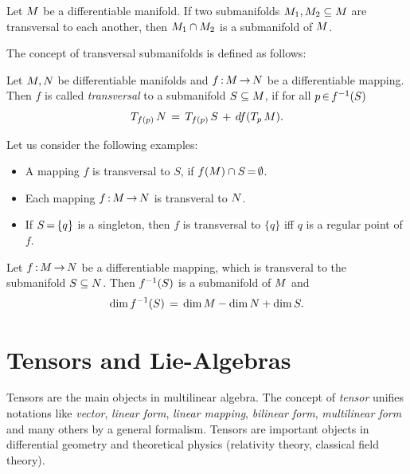 \documentclass[11pt,twoside]{article}
\begin{document}
\begin{theorem}
Let ${M}$ be a differentiable manifold.
If two submanifolds ${M}_1, {M}_2 \subseteq {M}$ are transversal
to each another,
then ${M}_1 \cap {M}_2$ is a submanifold of ${M}$.
\end{theorem}

\subparagraph{}
The concept of transversal submanifolds is defined as follows:

\begin{definition}
Let ${M},{N}$ be differentiable manifolds
and $f {\,:\,} {M} {\,\to\,} {N}$ be a differentiable mapping.
Then $f$ is called \textit{transversal}
to a submanifold ${S} \subseteq {M}$,
if for all $p {\,\in\,} f^{-1}(S)$
\[
T_{f(p)}\,{N} \,=\, T_{f(p)}\,{S} \, + \, df(T_p\,{M}).
\]
\end{definition}

\subparagraph{}
Let us consider the following examples:

\begin{itemize}[leftmargin=15pt]
\item[1.]
A mapping $f$ is transversal to $S$,
if $f({M}) \cap S {\,=\,} \emptyset$.
\item[2.]
Each mapping $f{\,:\,} {M} {\,\to\,} {N}$ is transveral to ${N}$.
\item[3.]
If $S {\,=\,} \{q\}$ is a singleton,
then $f$ is transversal to $\{q\}$ iff $q$ is a regular point of $f$.
\end{itemize}

\begin{theorem}
Let $f{\,:\,} {M} {\,\to\,} {N}$ be a differentiable mapping,
which is transveral to the submanifold ${S} \subseteq {N}$.
Then $f^{-1}({S})$ is a submanifold of ${M}$ and
\[
\operatorname{dim} f^{-1}(S) \,=\, \operatorname{dim} {M}
                              - \operatorname{dim} {N}
                              + \operatorname{dim} {S}.
\]
\end{theorem}

\newpage
\thispagestyle{empty}
\part{Tensors and Lie-Algebras}                                                %
Tensors are the main objects in multilinear algebra.
The concept of \textit{tensor} unifies notations like \textit{vector},
\textit{linear form}, \textit{linear mapping}, \textit{bilinear form},
\textit{multilinear form} and many others by a general formalism.
Tensors are important objects in differential geometry
and theoretical physics (relativity theory, classical field theory).
\end{document}
